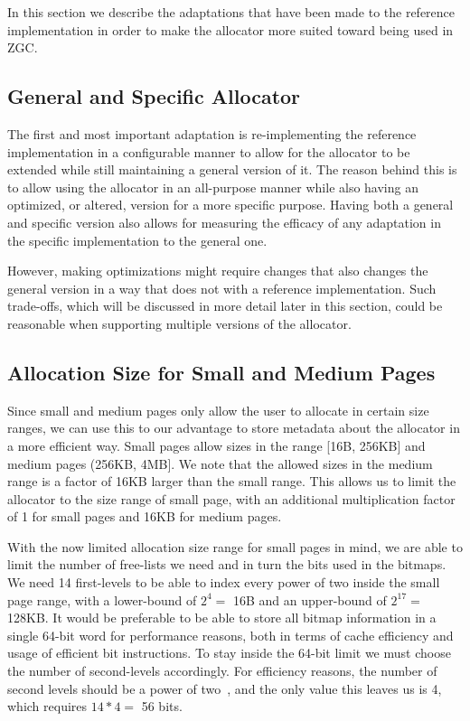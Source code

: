 
In this section we describe the adaptations that have been made to the reference implementation in order to make the allocator more suited toward being used in ZGC.

\subsection{General and Specific Allocator}

The first and most important adaptation is re-implementing the reference implementation in a configurable manner to allow for the allocator to be extended while still maintaining a general version of it. The reason behind this is to allow using the allocator in an all-purpose manner while also having an optimized, or altered, version for a more specific purpose. Having both a general and specific version also allows for measuring the efficacy of any adaptation in the specific implementation to the general one.

However, making optimizations might require changes that also changes the general version in a way that does not with a reference implementation. Such trade-offs, which will be discussed in more detail later in this section, could be reasonable when supporting multiple versions of the allocator.

\subsection{Allocation Size for Small and Medium Pages}

Since small and medium pages only allow the user to allocate in certain size ranges, we can use this to our advantage to store metadata about the allocator in a more efficient way. Small pages allow sizes in the range [16B, 256KB] and medium pages (256KB, 4MB]. We note that the allowed sizes in the medium range is a factor of 16KB larger than the small range. This allows us to limit the allocator to the size range of small page, with an additional multiplication factor of 1 for small pages and 16KB for medium pages.

With the now limited allocation size range for small pages in mind, we are able to limit the number of free-lists we need and in turn the bits used in the bitmaps. We need 14 first-levels to be able to index every power of two inside the small page range, with a lower-bound of $2^4 =$ 16B and an upper-bound of $2^{17} =$ 128KB. It would be preferable to be able to store all bitmap information in a single 64-bit word for performance reasons, both in terms of cache efficiency and usage of efficient bit instructions. To stay inside the 64-bit limit we must choose the number of second-levels accordingly. For efficiency reasons, the number of second levels should be a power of two~\cite{tlsf}, and the only value this leaves us is 4, which requires $14 * 4 =$ 56 bits.

